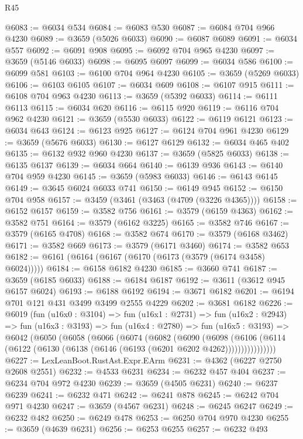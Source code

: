 \begin{lexlean}{R45}
\begin{coremodule}
@6083 := @6034 @534
@6084 := @6083 @530
@6087 := @6084 @704 @966 @4230
@6089 := @3659 (@5026 @6033)
@6090 := @6087 @6089
@6091 := @6034 @557
@6092 := @6091 @908
@6095 := @6092 @704 @965 @4230
@6097 := @3659 (@5146 @6033)
@6098 := @6095 @6097
@6099 := @6034 @586
@6100 := @6099 @581
@6103 := @6100 @704 @964 @4230
@6105 := @3659 (@5269 @6033)
@6106 := @6103 @6105
@6107 := @6034 @609
@6108 := @6107 @915
@6111 := @6108 @704 @963 @4230
@6113 := @3659 (@5392 @6033)
@6114 := @6111 @6113
@6115 := @6034 @620
@6116 := @6115 @920
@6119 := @6116 @704 @962 @4230
@6121 := @3659 (@5530 @6033)
@6122 := @6119 @6121
@6123 := @6034 @643
@6124 := @6123 @925
@6127 := @6124 @704 @961 @4230
@6129 := @3659 (@5676 @6033)
@6130 := @6127 @6129
@6132 := @6034 @465 @402
@6135 := @6132 @932 @960 @4230
@6137 := @3659 (@5825 @6033)
@6138 := @6135 @6137
@6139 := @6034 @664
@6140 := @6139 @936
@6143 := @6140 @704 @959 @4230
@6145 := @3659 (@5983 @6033)
@6146 := @6143 @6145
@6149 := @3645 @6024 @6033 @741
@6150 := @6149 @945
@6152 := @6150 @704 @958
@6157 := @3459 (@3461 (@3463 (@4709 (@3226 @4365))))
@6158 := @6152 @6157
@6159 := @3582 @756
@6161 := @3579 (@6159 @4363)
@6162 := @3582 @751
@6164 := @3579 (@6162 @3225)
@6165 := @3582 @746
@6167 := @3579 (@6165 @4708)
@6168 := @3582 @674
@6170 := @3579 (@6168 @3462)
@6171 := @3582 @669
@6173 := @3579 (@6171 @3460)
@6174 := @3582 @653
@6182 := @6161 (@6164 (@6167 (@6170 (@6173 (@3579 (@6174 @3458) @6024)))))
@6184 := @6158 @6182 @4230
@6185 := @3660 @741
@6187 := @3659 (@6185 @6033)
@6188 := @6184 @6187
@6192 := @3611 (@3612 @945 @6157 @6024)
@6193 := @6188 @6192
@6194 := @3671 @6182
@6201 := @6194 @701 @121 @431 @3499 @3499 @2555 @4229
@6202 := @3681 @6182
@6226 := @6019
    (fun (u16x0 : @3104) =>
    fun (u16x1 : @2731) =>
    fun (u16x2 : @2943) =>
    fun (u16x3 : @3193) =>
    fun (u16x4 : @2780) =>
    fun (u16x5 : @3193) =>
    @6042
      (@6050
        (@6058
          (@6066
            (@6074
              (@6082
                (@6090
                  (@6098
                    (@6106
                      (@6114 (@6122 (@6130 (@6138 (@6146 (@6193 (@6201 @6202 @4262))))))))))))))))
@6227 := LexLeanBoot.RustAst.Expr.EArm
@6231 := @4362 (@6227 @2750 @2608 @2551)
@6232 := @4533 @6231
@6234 := @6232 @457 @404
@6237 := @6234 @704 @972 @4230
@6239 := @3659 (@4505 @6231)
@6240 := @6237 @6239
@6241 := @6232 @471
@6242 := @6241 @878
@6245 := @6242 @704 @971 @4230
@6247 := @3659 (@4567 @6231)
@6248 := @6245 @6247
@6249 := @6232 @482
@6250 := @6249 @478
@6253 := @6250 @704 @970 @4230
@6255 := @3659 (@4639 @6231)
@6256 := @6253 @6255
@6257 := @6232 @493

\end{coremodule}
\end{lexlean}
